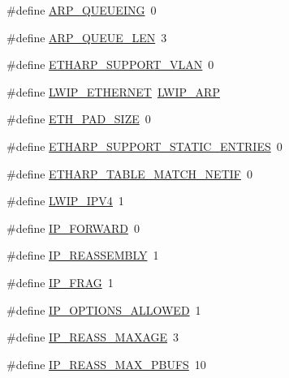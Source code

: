 \begin{DoxyCompactItemize}
\item 
\#define \hyperlink{group__lwip__opts__arp_ga75837814536af29b6102508588d0ab58}{A\+R\+P\+\_\+\+Q\+U\+E\+U\+E\+I\+NG}~0
\item 
\#define \hyperlink{group__lwip__opts__arp_ga29f41a6ebdbb23f46688d381b3609fd1}{A\+R\+P\+\_\+\+Q\+U\+E\+U\+E\+\_\+\+L\+EN}~3
\item 
\#define \hyperlink{group__lwip__opts__arp_ga70ce0ecf56cf5fab000134e66d863f90}{E\+T\+H\+A\+R\+P\+\_\+\+S\+U\+P\+P\+O\+R\+T\+\_\+\+V\+L\+AN}~0
\item 
\#define \hyperlink{group__lwip__opts__arp_ga30e02dc217cc2995d0fd241d510c904f}{L\+W\+I\+P\+\_\+\+E\+T\+H\+E\+R\+N\+ET}~\hyperlink{group__lwip__opts__arp_ga9609a014bba4638cc191d6a8f9556c87}{L\+W\+I\+P\+\_\+\+A\+RP}
\item 
\#define \hyperlink{group__lwip__opts__arp_gad7fa3b356ca7e603e848b069c4cc6276}{E\+T\+H\+\_\+\+P\+A\+D\+\_\+\+S\+I\+ZE}~0
\item 
\#define \hyperlink{group__lwip__opts__arp_ga4675829464156f3d665f4de171c212d7}{E\+T\+H\+A\+R\+P\+\_\+\+S\+U\+P\+P\+O\+R\+T\+\_\+\+S\+T\+A\+T\+I\+C\+\_\+\+E\+N\+T\+R\+I\+ES}~0
\item 
\#define \hyperlink{group__lwip__opts__arp_ga2f762eee309a545650f80fc8dcc19084}{E\+T\+H\+A\+R\+P\+\_\+\+T\+A\+B\+L\+E\+\_\+\+M\+A\+T\+C\+H\+\_\+\+N\+E\+T\+IF}~0
\item 
\#define \hyperlink{group__lwip__opts__ipv4_ga429e811a80ebb5157e14a854870c4410}{L\+W\+I\+P\+\_\+\+I\+P\+V4}~1
\item 
\#define \hyperlink{group__lwip__opts__ipv4_ga881d32ff5ee02af01f758953f1b51d59}{I\+P\+\_\+\+F\+O\+R\+W\+A\+RD}~0
\item 
\#define \hyperlink{group__lwip__opts__ipv4_ga1a31ab0e0f37b17d40fa7c35bc2c4f69}{I\+P\+\_\+\+R\+E\+A\+S\+S\+E\+M\+B\+LY}~1
\item 
\#define \hyperlink{group__lwip__opts__ipv4_gaf85c8bdd5035b6cada790b4cc2a209a4}{I\+P\+\_\+\+F\+R\+AG}~1
\item 
\#define \hyperlink{group__lwip__opts__ipv4_gaa956b0167c37a2265b55e2d0204a3933}{I\+P\+\_\+\+O\+P\+T\+I\+O\+N\+S\+\_\+\+A\+L\+L\+O\+W\+ED}~1
\item 
\#define \hyperlink{group__lwip__opts__ipv4_gad41122bd0b5485a18a4415c8f953727b}{I\+P\+\_\+\+R\+E\+A\+S\+S\+\_\+\+M\+A\+X\+A\+GE}~3
\item 
\#define \hyperlink{group__lwip__opts__ipv4_ga29084a46d7d4be30e8029d356bca0394}{I\+P\+\_\+\+R\+E\+A\+S\+S\+\_\+\+M\+A\+X\+\_\+\+P\+B\+U\+FS}~10
\item 

\end{DoxyCompactItemize}
